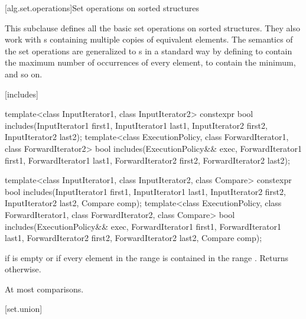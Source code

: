 [alg.set.operations]{Set operations on sorted structures}

\pnum
This subclause defines all the basic set operations on sorted structures.
They also work with
s
containing multiple copies of equivalent elements.
The semantics of the set operations are generalized to
s
in a standard way by defining
to contain the maximum number of occurrences of every element,
to contain the minimum, and so on.

[includes]{}

%
\begin{itemdecl}
template<class InputIterator1, class InputIterator2>
  constexpr bool includes(InputIterator1 first1, InputIterator1 last1,
                          InputIterator2 first2, InputIterator2 last2);
template<class ExecutionPolicy, class ForwardIterator1, class ForwardIterator2>
  bool includes(ExecutionPolicy&& exec,
                ForwardIterator1 first1, ForwardIterator1 last1,
                ForwardIterator2 first2, ForwardIterator2 last2);

template<class InputIterator1, class InputIterator2, class Compare>
  constexpr bool includes(InputIterator1 first1, InputIterator1 last1,
                          InputIterator2 first2, InputIterator2 last2,
                          Compare comp);
template<class ExecutionPolicy, class ForwardIterator1, class ForwardIterator2, class Compare>
  bool includes(ExecutionPolicy&& exec,
                ForwardIterator1 first1, ForwardIterator1 last1,
                ForwardIterator2 first2, ForwardIterator2 last2,
                Compare comp);
\end{itemdecl}

\begin{itemdescr}
\pnum
\returns
{}
if  is empty or
if every element in the range
is contained in the range
.
Returns
otherwise.

\pnum
\complexity
At most
comparisons.
\end{itemdescr}

[set.union]{}

